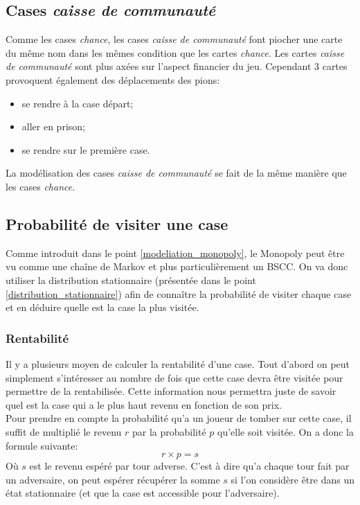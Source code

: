 \documentclass[letterpaper]{article}
\begin{document}
  \subsection{Cases \textit{caisse de communauté}}
    Comme les cases \textit{chance}, les cases \textit{caisse de 
    communauté} font piocher une carte du même nom dans les mêmes
    condition que les cartes \textit{chance}.  Les cartes 
    \textit{caisse de communauté} sont plus axées sur l'aspect 
    financier du jeu. Cependant 3 cartes provoquent également des 
    déplacements des pions:
    \begin{itemize}
     \item se rendre à la case départ;
     \item aller en prison;
     \item se rendre sur le première case.
    \end{itemize}
    La modélisation des cases \textit{caisse de communauté} se fait de la 
    même manière que les cases \textit{chance}.
    
  \subsection{Probabilité de visiter une case}
    Comme introduit dans le point \ref{modeliation_monopoly}, le Monopoly
    peut être vu comme une chaîne de Markov et plus particulièrement un
    BSCC.  On va donc utiliser la distribution stationnaire (présentée dans
    le point \ref{distribution_stationnaire}) afin de connaître la
    probabilité de visiter chaque case et en déduire quelle est la case la
    plus visitée.
    
  \subsubsection{Rentabilité}
    \label{rentabilite}
    Il y a plusieurs moyen de calculer la rentabilité d'une case.  Tout 
    d'abord on peut simplement s'intéresser au nombre de fois que cette case
    devra être visitée pour permettre de la rentabilisée.  Cette information
    nous permettra juste de savoir quel est la case qui a le plus haut revenu en
    fonction de son prix.\\
    Pour prendre en compte la probabilité qu'a un joueur de tomber sur cette 
    case, il suffit de multiplié le revenu $r$ par la probabilité $p$ qu'elle soit
    visitée.  On a donc la formule suivante:
    $$r \times p = s$$
    Où $s$ est le revenu espéré par tour adverse.  C'est à dire qu'a chaque tour
    fait par un adversaire, on peut espérer récupérer la somme $s$ si l'on 
    considère être dans un état stationnaire (et que la case est accessible
    pour l'adversaire).
    
\end{document}
